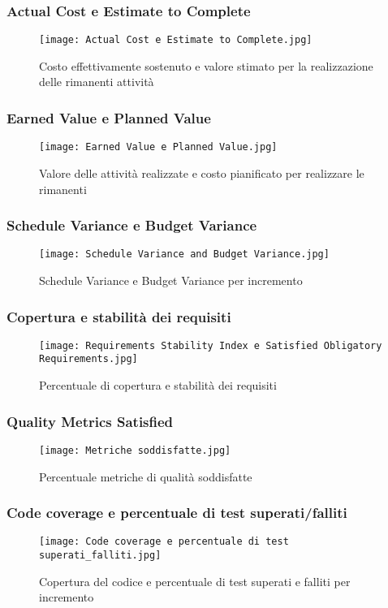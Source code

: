     \subsubsection{Actual Cost e Estimate to Complete}
    \begin{figure}[H]
      \centering
      \texttt{[image: Actual Cost e Estimate to Complete.jpg]}
      \caption{Costo effettivamente sostenuto e valore stimato per la realizzazione delle rimanenti attività}
    \end{figure}

    \subsubsection{Earned Value e Planned Value}
    \begin{figure}[H]
      \centering
      \texttt{[image: Earned Value e Planned Value.jpg]}
      \caption{Valore delle attività realizzate e costo pianificato per realizzare le rimanenti}
    \end{figure}

    \subsubsection{Schedule Variance e Budget Variance}
    \begin{figure}[H]
      \centering
      \texttt{[image: Schedule Variance and Budget Variance.jpg]}
      \caption{Schedule Variance e Budget Variance per incremento}
    \end{figure}

    \subsubsection{Copertura e stabilità dei requisiti}
    \begin{figure}[H]
      \centering
      \texttt{[image: Requirements Stability Index e Satisfied Obligatory Requirements.jpg]}
      \caption{Percentuale di copertura e stabilità dei requisiti}
    \end{figure}

    \subsubsection{Quality Metrics Satisfied}
    \begin{figure}[H]
      \centering
      \texttt{[image: Metriche soddisfatte.jpg]}
      \caption{Percentuale metriche di qualità soddisfatte}
    \end{figure}

    \subsubsection{Code coverage e percentuale di test superati/falliti}
    \begin{figure}[H]
      \centering
      \texttt{[image: Code coverage e percentuale di test superati\_falliti.jpg]}
      \caption{Copertura del codice e percentuale di test superati e falliti per incremento}
    \end{figure}
